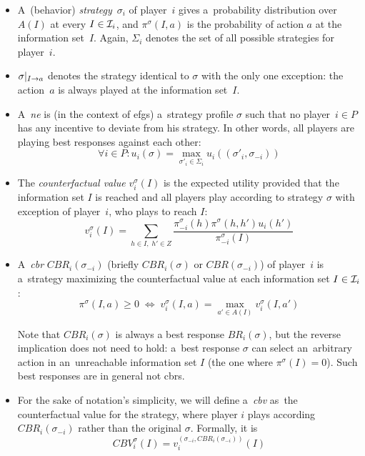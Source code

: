 \begin{itemize}
  \item A~(behavior) \emph{strategy}~$\sigma_i$ of player~$i$ gives a~probability distribution over $A(I)$ at every $I \in \mathcal{I}_i$, and $\pi ^\sigma (I, a)$ is the probability of action $a$ at the information set~$I$.
    Again, $\Sigma_i$ denotes the set of all possible strategies for player~$i$.

  \item $\sigma | _{I \rightarrow a}$ denotes the strategy identical to $\sigma$ with the only one exception:
    the action~$a$ is always played at the information set~$I$.

  \item A~\emph{\acrfull{ne}} is (in the context of \acrshort{efg}s) a~strategy profile $\sigma$ such that no player~$i \in P$ has any incentive to deviate from his strategy.
    In other words, all players are playing best responses against each other:
    \[ \forall i \in P\colon u_i (\sigma) = \max _{\sigma'_i \in \Sigma_i} u_i ((\sigma'_i, \sigma_{-i})) \]

  \item The \emph{counterfactual value} $v _i ^\sigma (I)$ is the expected utility provided that the information set $I$ is reached and all players play according to strategy $\sigma$ with exception of player~$i$, who plays to reach $I$:
    \[ v _i ^\sigma (I) = \sum\limits _{h \in I, \; h' \in Z}
      \frac
      {\pi _{-i} ^\sigma(h) \pi ^\sigma(h,h') u_i(h')}
      {\pi _{-i} ^\sigma (I)} \]

  \item A~\emph{\acrlong{cbr}} $CBR _i (\sigma _{-i})$ (briefly $CBR _i (\sigma)$ or $CBR(\sigma_{-i})$) of player~$i$ is a~strategy maximizing the counterfactual value at each information set $I \in \mathcal{I} _i$:
    \[ \pi ^\sigma (I, a) \geq 0
      \; \Longleftrightarrow \;
      v _i ^\sigma (I, a) = \max _{a' \in A(I)} v _i ^\sigma (I, a') \]

    Note that $CBR _i (\sigma)$ is always a best response $BR _i (\sigma)$, but the reverse implication does not need to hold:
    a~best response $\sigma$ can select an~arbitrary action in an~unreachable information set $I$ (the one where $\pi ^\sigma (I) = 0$).
    Such best responses are in general not \acrlong{cbr}s.

  \item For the sake of notation's simplicity, we will define a~\emph{\acrfull{cbv}} as~the counterfactual value for the strategy, where player $i$ plays according $CBR _i (\sigma _{-i})$ rather than the original $\sigma$.
    Formally, it is
    \[ CBV _i ^\sigma (I) = v _i ^{(\sigma _{-i}, CBR _i (\sigma _{-i} ))} (I) \]


\end{itemize}
